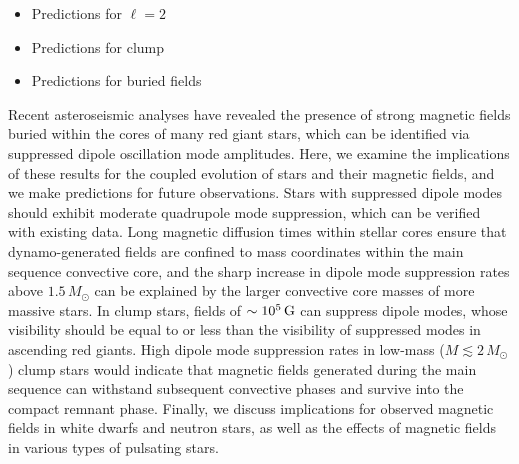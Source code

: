 \begin{itemize}
\item Predictions for $\ell = 2$
\item Predictions for clump 
\item Predictions for buried fields
\end{itemize}



Recent asteroseismic analyses have revealed the presence of strong magnetic fields buried within the cores of many red giant stars, which can be identified via suppressed dipole oscillation mode amplitudes. Here, we examine the implications of these results for the coupled evolution of stars and their magnetic fields, and we make predictions for future observations. Stars with suppressed dipole modes should exhibit moderate quadrupole mode suppression, which can be verified with existing data. Long magnetic diffusion times within stellar cores ensure that dynamo-generated fields are confined to mass coordinates within the main sequence convective core, and the sharp increase in dipole mode suppression rates above $1.5 \, M_\odot$ can be explained by the larger convective core masses of more massive stars.
In clump stars, fields of $\sim 10^5 \, {\rm G}$ can suppress dipole modes, whose visibility should be equal to or less than the visibility of suppressed modes in ascending red giants. High dipole mode suppression rates in low-mass ($M \lesssim 2 \, M_\odot$) clump stars would indicate that magnetic fields generated during the main sequence can withstand subsequent convective phases and survive into the compact remnant phase. Finally, we discuss implications for observed magnetic fields in white dwarfs and neutron stars, as well as the effects of magnetic fields in various types of pulsating stars.
  
  
  
  
  
  
  